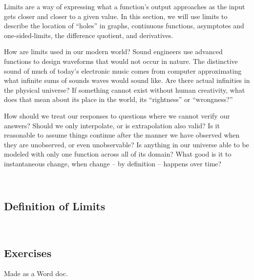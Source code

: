 


Limits are a way of expressing what a function's output approaches as the input gets
closer and closer to a given value.  In this section, we will use limits to describe the 
location of ``holes'' in graphs, continuous functions, asymptotes and one-sided-limits, 
the difference quotient, and derivatives.

How are limits used in our modern world?
Sound engineers use advanced functions to design waveforms that would not occur in nature.
The distinctive sound of much of today's electronic music comes from computer approximating
what infinite sums of sounds waves would sound like.  Are there actual infinities in the physical
universe?  If something cannot exist without human creativity, what does that mean about its
place in the world, its ``rightness'' or ``wrongness?'' 


How should we treat our responses to questions where we cannot verify our answers?
Should we only interpolate, or is extrapolation also valid?  Is it reasonable to assume
things continue after the manner we have observed when they are unobserved, or even
unobservable?  Is anything in our universe able to be modeled with only one function across
all of its domain? What good is it to instantaneous change, when change -- by definition --
happens over time?



\newpage
\chapterminitoc

\newpage
{}
\newpage

\newpage

~\vfill



{}
\subsection{Definition of Limits}
\noindent{}
\newpage

~\vfill
\newpage
\subsection{Exercises}
Made as a Word doc.
~\vfill


